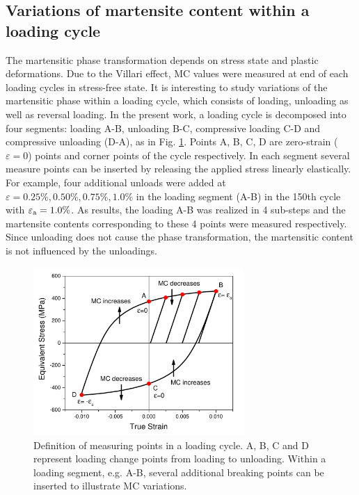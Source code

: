 \documentclass[preprint,5p,twocolumn,10pt,sort&compress]{elsarticle}
\begin{document}
\subsection{Variations of martensite content within a loading cycle}

The martensitic phase transformation depends on stress state and plastic deformations. Due to the Villari effect, MC values were measured at end of each loading cycles in stress-free state. It is interesting to study variations of the martensitic phase within a loading cycle, which consists of loading, unloading as well as reversal loading. In the present work, a loading cycle is decomposed into four segments: loading A-B, unloading B-C, compressive loading C-D and compressive unloading (D-A), as in Fig. \ref{fig:PointDefinition}. Points A, B, C, D are zero-strain ($\varepsilon=0$) points and corner points of the cycle respectively.  In each segment several measure points can be inserted by releasing the applied stress linearly elastically. For example, four additional unloads were added at $\varepsilon=0.25\%,0.50\%,0.75\%,1.0\%$ in the loading segment (A-B) in the 150th cycle with $\varepsilon_{\rm a}=1.0\%$. As results, the loading A-B was realized in 4 sub-steps and the martensite contents corresponding to these 4 points were measured respectively. Since unloading does not cause the phase transformation, the martensitic content is not influenced by the unloadings.

\begin{figure}[!h]
  \begin{center}
  \includegraphics[width=8cm]{Steploadingcurve.pdf}
  \caption{Definition of measuring points in a loading cycle. A, B, C and D represent loading change points from loading to unloading.  Within a loading segment, e.g. A-B, several additional breaking points can be inserted to illustrate MC variations.}
  \label{fig:PointDefinition}
  \end{center}
\end{figure}
\end{document}
